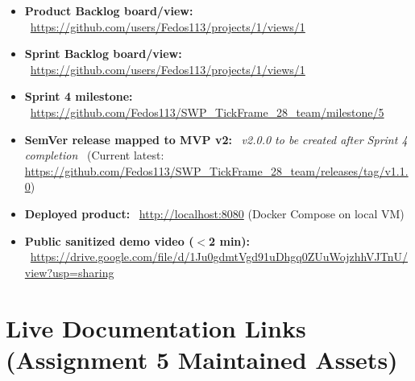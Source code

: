 \documentclass[11pt,a4paper]{article}
\begin{document}
\begin{itemize}[leftmargin=*]
    \item \textbf{Product Backlog board/view:} \
          \url{https://github.com/users/Fedos113/projects/1/views/1}

    \item \textbf{Sprint Backlog board/view:} \
          \url{https://github.com/users/Fedos113/projects/1/views/1}

    \item \textbf{Sprint 4 milestone:} \
          \url{https://github.com/Fedos113/SWP_TickFrame_28_team/milestone/5}

    \item \textbf{SemVer release mapped to MVP v2:} \
          \textit{v2.0.0 to be created after Sprint 4 completion} \
          (Current latest: \url{https://github.com/Fedos113/SWP_TickFrame_28_team/releases/tag/v1.1.0})

    \item \textbf{Deployed product:} \
          \url{http://localhost:8080} (Docker Compose on local VM)

    \item \textbf{Public sanitized demo video ($<$2 min):} \
          \url{https://drive.google.com/file/d/1Ju0gdmtVgd91uDhgq0ZUuWojzhhVJTnU/view?usp=sharing}
\end{itemize}

\section{Live Documentation Links (Assignment 5 Maintained Assets)}
\end{document}
